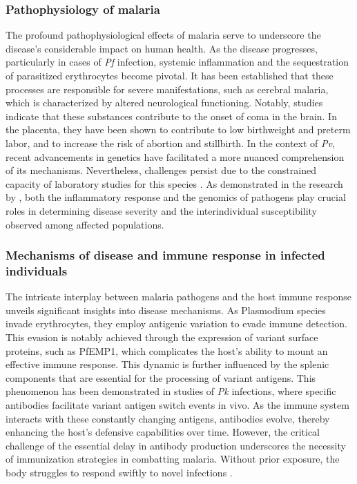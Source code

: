 \subsubsection{Pathophysiology of malaria}
The profound pathophysiological effects of malaria serve to underscore the disease's considerable impact on human health. As the disease progresses, particularly in cases of \emph{Pf} infection, systemic inflammation and the sequestration of parasitized erythrocytes become pivotal. It has been established that these processes are responsible for severe manifestations, such as cerebral malaria, which is characterized by altered neurological functioning. Notably, studies indicate that these substances contribute to the onset of coma in the brain. In the placenta, they have been shown to contribute to low birthweight and preterm labor, and to increase the risk of abortion and stillbirth. In the context of \emph{Pv}, recent advancements in genetics have facilitated a more nuanced comprehension of its mechanisms. Nevertheless, challenges persist due to the constrained capacity of laboratory studies for this species \cite{Auburn2016}. As demonstrated in the research by \cite{Getachew2015}, both the inflammatory response and the genomics of pathogens play crucial roles in determining disease severity and the interindividual susceptibility observed among affected populations.
 
\subsubsection{Mechanisms of disease and immune response in infected individuals}
The intricate interplay between malaria pathogens and the host immune response unveils significant insights into disease mechanisms.  As Plasmodium species invade erythrocytes, they employ antigenic variation to evade immune detection. This evasion is notably achieved through the expression of variant surface proteins, such as PfEMP1, which complicates the host's ability to mount an effective immune response. This dynamic is further influenced by the splenic components that are essential for the processing of variant antigens. This phenomenon has been demonstrated in studies of \emph{Pk} infections, where specific antibodies facilitate variant antigen switch events in vivo. As the immune system interacts with these constantly changing antigens, antibodies evolve, thereby enhancing the host's defensive capabilities over time. However, the critical challenge of the essential delay in antibody production underscores the necessity of immunization strategies in combatting malaria. Without prior exposure, the body struggles to respond swiftly to novel infections \cite{GALINSKI2017}. 

